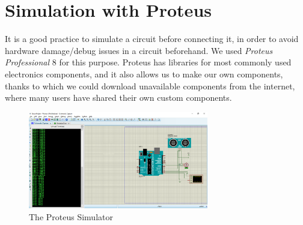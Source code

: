 \section{Simulation with Proteus}
It is a good practice to simulate a circuit before connecting it, in order to avoid hardware damage/debug issues in a circuit beforehand. We used \emph{Proteus Professional} 8 for this purpose. Proteus has libraries for most commonly used electronics components, and it also allows us to make our own components, thanks to which we could download unavailable components from the internet, where many users have shared their own custom components.
\begin{figure}[H]
	\vfill
	\centering
	\includegraphics[width=0.7\textwidth]{../Files/proteus}
	\caption{The Proteus Simulator}  \label{fig:proteus}
\end{figure}

